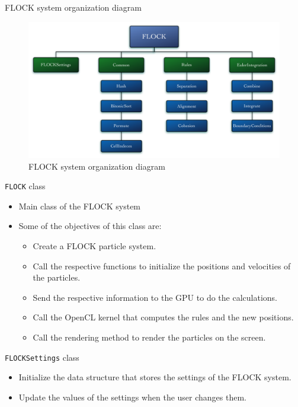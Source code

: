 \documentclass[red]{beamer}
\begin{document}
\begin{frame}{FLOCK system organization diagram}
	\begin{figure}[htbp]
	\begin{center}
	\includegraphics[scale=0.25]{../figures/FLOCKdiagramMyrna.pdf}
	\caption{FLOCK system organization diagram}
	\end{center}
	\end{figure}
\end{frame}

\begin{frame}{\texttt{FLOCK} class}
	\begin{itemize}
		\pause \item Main class of the FLOCK system
		\pause \item Some of the objectives of this class are:
			\begin{itemize}
				\pause \item Create a FLOCK particle system.
				\pause \item Call the respective functions to initialize the positions and velocities of the particles.
				\pause \item Send the respective information to the GPU to do the calculations.
				\pause \item Call the OpenCL kernel that computes the rules and the new positions.
				 \pause \item Call the rendering method to render the particles on the screen.
			\end{itemize}
	\end{itemize}
\end{frame}

\begin{frame}{\texttt{FLOCKSettings} class}
	\begin{itemize}
		\pause \item Initialize the data structure that stores the settings of the FLOCK system.
		\pause \item Update the values of the settings when the user changes them.
	\end{itemize}
\end{frame}
\end{document}
